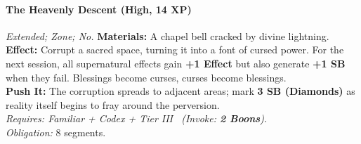 \paragraph{The Heavenly Descent (High, 14 XP)} \emph{Extended; Zone; No.}
\textbf{Materials:} A chapel bell cracked by divine lightning.\\
\textbf{Effect:} Corrupt a sacred space, turning it into a font of cursed power. For the next session, all supernatural effects gain \textbf{+1 Effect} but also generate \textbf{+1 SB} when they fail. Blessings become curses, curses become blessings.\\
\textbf{Push It:} The corruption spreads to adjacent areas; mark \textbf{3 SB (Diamonds)} as reality itself begins to fray around the perversion.\\
\emph{Requires: Familiar + Codex + Tier III \ (\textit{Invoke:} \textbf{2 Boons}).}\\
\emph{Obligation:} 8 segments.

